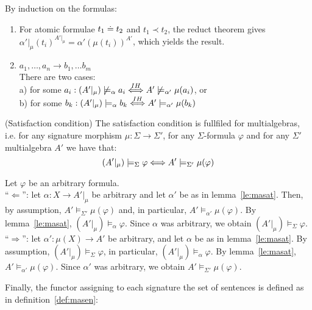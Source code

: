 \begin{PROOF}
By induction on the formulas:
\begin{enumerate}
 
\item For atomic formulae $t_1 \mathrel{\dot{=} }  t_2$ and $t_1\prec t_2$, the reduct theorem
gives $\alpha'|_\mu(t_i)^{A'|_{\mu}}=\alpha'(\mu(t_i))^{A'}$, which yields
the result.

\item $a_1, \ldots ,a_n \rightarrow b_1, \ldots b_m$ \label{it:conditional}\\
There are two cases:\\
a) for some $a_i: (A' |_\mu) \not\models_\alpha a_i \stackrel{IH}{\Longleftrightarrow}
A' \not\models_{\alpha'} \mu(a_i)$, or\\
b) for some $b_k: (A' |_\mu) \models_\alpha b_k
  \stackrel{IH}{\Longleftrightarrow} A' \models_{\alpha'} \mu(b_k)$
\end{enumerate}
\end{PROOF}
%
\begin{lemma}\label{th:masat}(Satisfaction condition)
The satisfaction condition is fullfiled for multialgebras, i.e. for any
signature morphism $\mu: \Sigma \to \Sigma'$, for any $\Sigma$-formula
$\varphi$ and for any $\Sigma'$ multialgebra $A'$ we have that:
\[ (A' |_\mu) \models_\Sigma \varphi \Longleftrightarrow A' \models_{\Sigma'} \mu(\varphi) \]
\end{lemma}
\begin{PROOF} Let $\varphi$ be an arbitrary formula.\\
``$\Leftarrow$'': let $\alpha:X \to A'|_\mu$ be arbitrary and let $\alpha'$
 be as in lemma~\ref{le:masat}. Then, by assumption, $A' \models_{\Sigma'}
 \mu(\varphi)$ and, in particular, $A' \models_{\alpha'} \mu(\varphi)$. By
 lemma~\ref{le:masat}, $(A' |_\mu) \models_\alpha \varphi$. Since $\alpha$
 was arbitrary, we obtain $(A' |_\mu) \models_\Sigma \varphi$.\\
``$\Rightarrow$'': let $\alpha':\mu(X) \to A'$ be arbitrary, and let $\alpha$
 be as in lemma~\ref{le:masat}. By assumption, $(A' |_\mu) \models_\Sigma
 \varphi$, in particular, $(A' |_\mu) \models_\alpha \varphi$. By
 lemma~\ref{le:masat}, $A' \models_{\alpha'} \mu(\varphi)$. Since $\alpha'$
 was arbitrary, we obtain $A' \models_{\Sigma'} \mu(\varphi)$.
\end{PROOF}
%
Finally, the functor assigning to each signature the set of sentences is
defined as in definition~\ref{def:masen}:
